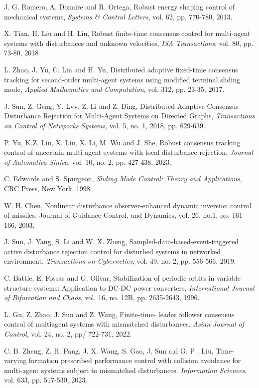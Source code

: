 \documentclass[journal,twoside]{IEEEtran}
\begin{document}
\begin{thebibliography}{00}
J. G. Romero, A. Donaire and R. Ortega, Robust energy shaping control of mechanical systems, {\it Systems \& Control Letters}, vol. 62, pp. 770-780, 2013.


X. Tian, H. Liu and H. Liu, Robust finite-time consensus control for multi-agent systems with disturbances and unknown velocities, {\it ISA Transactions}, vol. 80, pp. 73-80, 2018

L. Zhao, J. Yu, C. Lin and H. Yu, Distributed adaptive fixed-time consensus tracking for
second-order multi-agent systems using modified terminal sliding mode, {\it Applied Mathematics and Computation}, vol. 312, pp. 23-35, 2017.

J. Sun, Z. Geng, Y. Lvv, Z. Li and Z. Ding, Distributed Adaptive Consensus Disturbance Rejection for Multi-Agent Systems on Directed Graphs, {\it Transactions on Control of Netwporks Systems}, vol. 5, no. 1, 2018, pp. 629-639. 

P. Yu, K.Z. Liu, X. Liu, X. Li, M. Wu and J. She, Robust consensus tracking control of uncertain multi-agent systems with local disturbance rejection. {\it Journal of Automatica Sinica}, vol. 10, no. 2, pp. 427-438, 2023.

C. Edwards and S. Spurgeon, {\it Sliding Mode Control: Theory and
Applications}, CRC Press, New York, 1998.

W. H. Chen, Nonlinear disturbance observer-enhanced dynamic inversion control of missiles. {Journal of Guidance Control, and Dynamics}, vol. 26, no.1, pp. 161-166, 2003.

J. Sun, J. Yang, S. Li and W. X. Zheng, Sampled-data-based-event-triggered active disturbance rejection control for disturbed systems in networked environment, {\it Transactions on Cybernetics}, vol. 49, no. 2, pp. 556-566, 2019. 

C. Battle, E. Fossas and G. Olivar, Stabilization of periodic orbits in variable structure systems: Application to DC-DC power converters. {\it International Journal of Bifurcation and Chaos}, vol. 16, no. 12B, pp. 2635-2643, 1996.  

L. Gu, Z. Zhao, J. Sun and Z. Wang, Finite-time- leader follower consensus control of multiagent systems with mismatched disturbances. {\it Asian Journal of Control}, vol. 24, no. 2, pp/ 722-731, 2022.

C. B. Zheng, Z. H. Pang, J. X. Wang, S. Gao, J. Sun a,d G. P . Liu, Time-varying formation prescribed performance control with collision avoidance for multi-agent systems subject to mismatched disturbances. {\it Information Sciences}, vol. 633, pp. 517-530, 2023.


\end{thebibliography}
\end{document}
